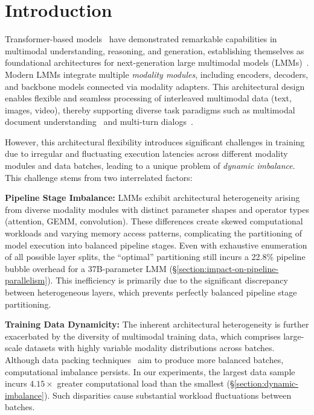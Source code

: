 \section{Introduction}

Transformer-based models~\cite{transformer-nips17,qwen2-5-arxiv25,deepseek-v3-arxiv25,llama3-arxiv24} have demonstrated remarkable capabilities in multimodal understanding, reasoning, and generation, establishing themselves as foundational architectures for next-generation large multimodal models (LMMs)~\cite{qwen2.5-vl-arxiv25,gpt4o-arxiv24,llama3-arxiv24,step-audio-arxiv25,step-t2v-arxiv25,gemini-3-2025}. Modern LMMs integrate multiple \emph{modality modules}, including encoders, decoders, and backbone models connected via modality adapters. This architectural design enables flexible and seamless processing of interleaved multimodal data (\eg text, images, video), thereby supporting diverse task paradigms such as multimodal document understanding~\cite{mlongdoc-arxiv24} and multi-turn dialogs~\cite{gpt4o-image-generation}.

However, this architectural flexibility introduces significant challenges in training due to irregular and fluctuating execution latencies across different modality modules and data batches, leading to a unique problem of \emph{dynamic imbalance}. This challenge stems from two interrelated factors:

\textbf{Pipeline Stage Imbalance:}
LMMs exhibit architectural heterogeneity arising from diverse modality modules with distinct parameter shapes and operator types (\eg attention, GEMM, convolution). These differences create skewed computational workloads and varying memory access patterns, complicating the partitioning of model execution into balanced pipeline stages.
Even with exhaustive enumeration of all possible layer splits, the ``optimal'' partitioning still incurs a 22.8\% pipeline bubble overhead for a 37B-parameter LMM (\S\ref{section:impact-on-pipeline-parallelism}).
This inefficiency is primarily due to the significant discrepancy between heterogeneous layers, which prevents perfectly balanced pipeline stage partitioning.

\textbf{Training Data Dynamicity:}
The inherent architectural heterogeneity is further exacerbated by the diversity of multimodal training data, which comprises large-scale datasets with highly variable modality distributions across batches.
Although data packing techniques~\cite{wlb-llm-osdi25,dynapipe-eurosys24} aim to produce more balanced batches, computational imbalance persists. In our experiments, the largest data sample incurs $4.15\times$ greater computational load than the smallest (\S\ref{section:dynamic-imbalance}). Such disparities cause substantial workload fluctuations between batches.

